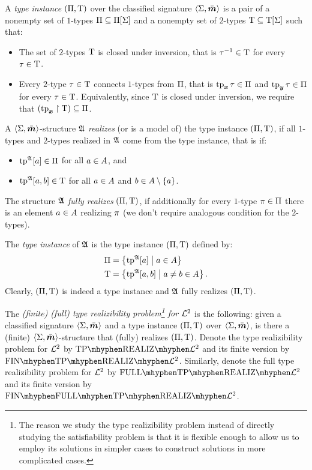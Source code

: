\begin{definition}\label{def:tpinst-twovar}
A \emph{type instance} $(\Pi,\mathrm{T})$ over the classified
signature $\left\langle \mathrm{\Sigma},\bar{\bm{m}} \right\rangle$ is a pair of a nonempty set of $1$-types
$\Pi\subseteq\Pi[\mathrm{\Sigma}]$ and a nonempty set of $2$-types
$\mathrm{T}\subseteq\mathrm{T}[\mathrm{\Sigma}]$ such that:
\begin{itemize}
  \item The set of $2$-types $\mathrm{T}$ is closed under inversion, that is
  $\tau^{-1}\in\mathrm{T}$ for every $\tau\in\mathrm{T}$.
  \item Every $2$-type $\tau\in\mathrm{T}$ connects $1$-types from $\Pi$,
  that is $\operatorname{tp}_{\bm{x}}\tau\in\Pi$ and $\operatorname{tp}_{\bm{y}}\tau\in\Pi$ for every $\tau\in\mathrm{T}$.
  Equivalently, since $\mathrm{T}$ is closed under inversion, we require that
  $(\operatorname{tp}_{\bm{x}}\restriction\mathrm{T})\subseteq\Pi$.
\end{itemize}

A $\left\langle \mathrm{\Sigma},\bar{\bm{m}} \right\rangle$-structure $\mathfrak{A}$ \emph{realizes} (or is a model of) the
type instance $(\Pi,\mathrm{T})$, if all $1$-types and $2$-types realized in
$\mathfrak{A}$ come from the type instance, that is if:
\begin{itemize}
  \item $\operatorname{tp}^{\mathfrak{A}}[a] \in \Pi$ for all $a\in A$, and
  \item $\operatorname{tp}^{\mathfrak{A}}[a,b] \in \mathrm{T}$ for all $a\in A$ and
  $b \in A\setminus\left\{a\right\}$.
\end{itemize}
The structure $\mathfrak{A}$ \emph{fully realizes} $(\Pi,\mathrm{T})$, if additionally
for every $1$-type $\pi \in \Pi$ there is an element $a \in A$
realizing $\pi$ (we don't require analogous condition for the $2$-types).

The \emph{type instance} of $\mathfrak{A}$ is the type instance $(\Pi,\mathrm{T})$
defined by:
\begin{align*}
  \Pi &= \left\{\operatorname{tp}^{\mathfrak{A}}[a]\mathrel{}\middle|\mathrel{}a \in A\right\} \\
  \mathrm{T} &= \left\{\operatorname{tp}^{\mathfrak{A}}[a,b]\mathrel{}\middle|\mathrel{}a\neq b \in A\right\}.
\end{align*}
Clearly, $(\Pi,\mathrm{T})$ is indeed a type instance and $\mathfrak{A}$ fully realizes
$(\Pi,\mathrm{T})$.

The \emph{(finite) (full) type realizibility problem\footnote{The
reason we study the type realizibility problem instead of directly studying the
satisfiability problem is that it is flexible enough to allow us to employ its
solutions in simpler cases to construct solutions in more complicated cases.}
for $\mathcal{L}^{2}$} is the following:
given a classified signature $\left\langle \mathrm{\Sigma},\bar{\bm{m}} \right\rangle$ and a type instance
$(\Pi,\mathrm{T})$ over $\left\langle \mathrm{\Sigma},\bar{\bm{m}} \right\rangle$, is there a (finite)
$\left\langle \mathrm{\Sigma},\bar{\bm{m}} \right\rangle$-structure that (fully) realizes $(\Pi,\mathrm{T})$.
Denote the type realizibility problem for $\mathcal{L}^{2}$ by
$\Real{\vFo2}$ and its finite version by $\FinReal{\vFo2}$.
Similarly, denote the full type realizibility problem for $\mathcal{L}^{2}$ by
$\FullReal{\vFo2}$ and its finite version by $\FinFullReal{\vFo2}$.
\end{definition}

